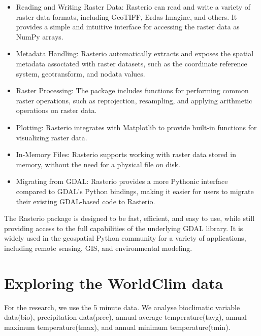 \documentclass[a4paper,14pt] {report}
\begin{document}
	\begin{itemize}
		\item Reading and Writing Raster Data: Rasterio can read and write a variety of raster data formats, including GeoTIFF, Erdas Imagine, and others. It provides a simple and intuitive interface for accessing the raster data as NumPy arrays. 
		\item Metadata Handling: Rasterio automatically extracts and exposes the spatial metadata associated with raster datasets, such as the coordinate reference system, geotransform, and nodata values.
		\item Raster Processing: The package includes functions for performing common raster operations, such as reprojection, resampling, and applying arithmetic operations on raster data.
		\item Plotting: Rasterio integrates with Matplotlib to provide built-in functions for visualizing raster data.
		\item In-Memory Files: Rasterio supports working with raster data stored in memory, without the need for a physical file on disk.
		\item Migrating from GDAL: Rasterio provides a more Pythonic interface compared to GDAL's Python bindings, making it easier for users to migrate their existing GDAL-based code to Rasterio.
	\end{itemize}
	
	The Rasterio package is designed to be fast, efficient, and easy to use, while still providing access to the full capabilities of the underlying GDAL library. It is widely used in the geospatial Python community for a variety of applications, including remote sensing, GIS, and environmental modeling.
			
	\chapter{Exploring the WorldClim data}
	For the research, we use the 5 minute data.
	We analyse bioclimatic variable data(bio), precipitation data(prec), annual average temperature(tavg), annual maximum temperature(tmax), and annual minimum temperature(tmin).
\end{document}
